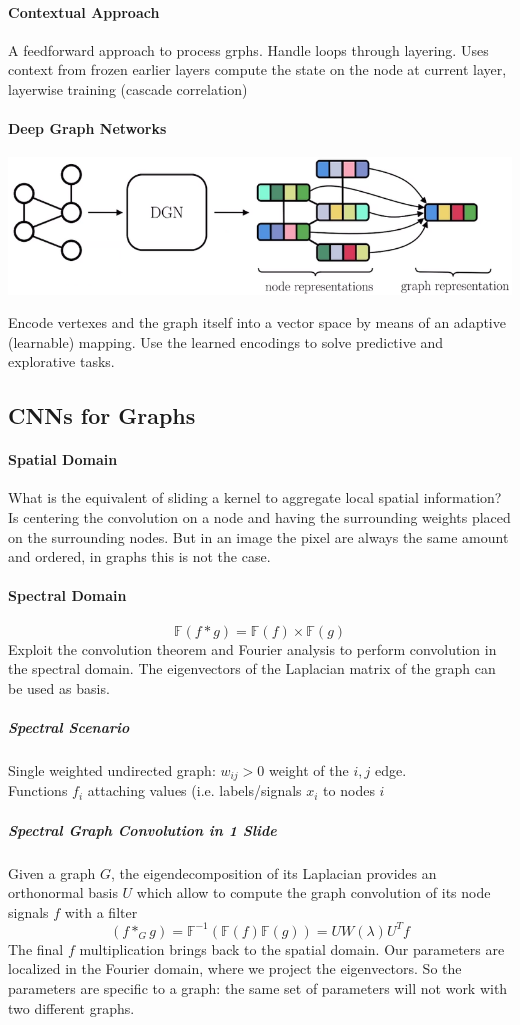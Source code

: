 \documentclass[10pt]{report}
\begin{document}
\paragraph{Contextual Approach} A feedforward approach to process grphs. Handle loops through layering. Uses context from frozen earlier layers compute the state on the node at current layer, layerwise training (cascade correlation) %
\paragraph{Deep Graph Networks}
\begin{center}
	\includegraphics[scale=0.5]{195.png}
\end{center}
Encode vertexes and the graph itself into a vector space by means of an adaptive (learnable) mapping. Use the learned encodings to solve predictive and explorative tasks.
\subsection{CNNs for Graphs}
\paragraph{Spatial Domain} What is the equivalent of sliding a kernel to aggregate local spatial information? Is centering the convolution on a node and having the surrounding weights placed on the surrounding nodes. But in an image the pixel are always the same amount and ordered, in graphs this is not the case.
\paragraph{Spectral Domain} $$\mathbb{F}(f*g) = \mathbb{F}(f)\times
 \mathbb{F}(g)$$
Exploit the convolution theorem and Fourier analysis to perform convolution in the spectral domain. The eigenvectors of the Laplacian matrix of the graph can be used as basis.
\subparagraph{Spectral Scenario} Single weighted undirected graph: $w_{ij}>0$ weight of the $i,j$ edge.\\
Functions $f_i$ attaching values (i.e. labels/signals $x_i$ to nodes $i$ %
\subparagraph{Spectral Graph Convolution in 1 Slide} Given a graph $G$, the eigendecomposition of its Laplacian provides an orthonormal basis $U$ which allow to compute the graph convolution of its node signals $f$ with a filter 
$$(f*_G g) = \mathbb{F}^{-1}(\mathbb{F}(f)\mathbb{F}(g)) = UW(\lambda)U^Tf$$
The final $f$ multiplication brings back to the spatial domain. Our parameters are localized in the Fourier domain, where we project the eigenvectors. So the parameters are specific to a graph: the same set of parameters will not work with two different graphs.
\end{document}
